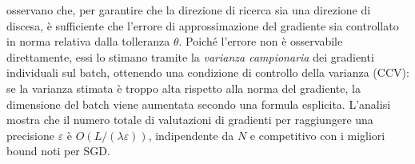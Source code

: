 osservano che, per garantire che la direzione di ricerca sia una direzione di
discesa, è sufficiente che l'errore di approssimazione del gradiente sia
controllato in norma relativa dalla tolleranza $\theta$. Poiché l'errore non è
osservabile direttamente, essi lo stimano tramite la \emph{varianza campionaria}
dei gradienti individuali sul batch, ottenendo una condizione di controllo
della varianza (CCV): se la varianza stimata è troppo alta rispetto alla norma
del gradiente, la dimensione del batch viene aumentata secondo una formula
esplicita. L'analisi mostra che il numero totale di valutazioni di gradienti
per raggiungere una precisione $\varepsilon$ è $O(L/(\lambda\varepsilon))$,
indipendente da $N$ e competitivo con i migliori bound noti per SGD.
